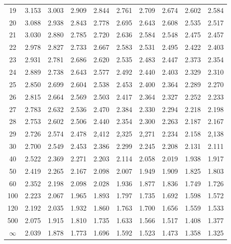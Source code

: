 \documentclass[12pt]{article}
\begin{document}
\begin{table}
\begin{center}
{\begin{tabular}{|c|c|c|c|c|c|c|c|c|c|}
19 & 3.153 &3.003 &2.909 &2.844 &2.761 &2.709 &2.674 &2.602 &2.584\\
20 &3.088 &2.938 &2.843 &2.778 &2.695 &2.643 &2.608 &2.535 &2.517\\
21 & 3.030 &2.880 &2.785 &2.720 &2.636 &2.584 &2.548 &2.475 &2.457\\
22 & 2.978 &2.827 &2.733 &2.667 &2.583 &2.531 &2.495 &2.422 &2.403\\
23 & 2.931 &2.781 &2.686 &2.620 &2.535 &2.483 &2.447 &2.373 &2.354\\
24 & 2.889 &2.738 &2.643 &2.577 &2.492 &2.440 &2.403 &2.329 &2.310\\
25 & 2.850 &2.699 &2.604 &2.538 &2.453 &2.400 &2.364 &2.289 &2.270\\
26 & 2.815 &2.664 &2.569 &2.503 &2.417 &2.364 &2.327 &2.252 &2.233\\
27 & 2.783 &2.632 &2.536 &2.470 &2.384 &2.330 &2.294 &2.218 &2.198\\
28 & 2.753 &2.602 &2.506 &2.440 &2.354 &2.300 &2.263 &2.187 &2.167\\
29 & 2.726 &2.574 &2.478 &2,412 &2,325 &2,271 &2.234 &2.158 &2,138\\
30 & 2.700 &2.549 &2.453 &2.386 &2.299 &2.245 &2.208 &2.131 &2.111\\
40 & 2.522 &2.369 &2.271 &2.203 &2.114 &2.058 &2.019 &1.938 &1.917\\
50 & 2.419 &2.265 &2.167 &2.098 &2.007 &1.949 &1.909 &1.825 &1.803\\
60 & 2.352 &2.198 &2.098 &2.028 &1.936 &1.877 &1.836 &1.749 &1.726\\
100 & 2.223 &2.067 &1.965 &1.893 &1.797 &1.735 &1.692 &1.598 &1.572\\
120 & 2.192 &2.035 &1.932 &1.860 &1.763 &1.700 &1.656 &1.559 &1.533\\
500 & 2.075 &1.915 &1.810 &1.735 &1.633 &1.566 &1.517 &1.408 &1.377\\ \hline
$\infty$ & 2.039 &1.878 &1.773 &1.696 &1.592 &1.523 &1.473 &1.358 &1.325\\
  \hline
\end{tabular}
}
\end{center}
\end{table}
\end{document}
